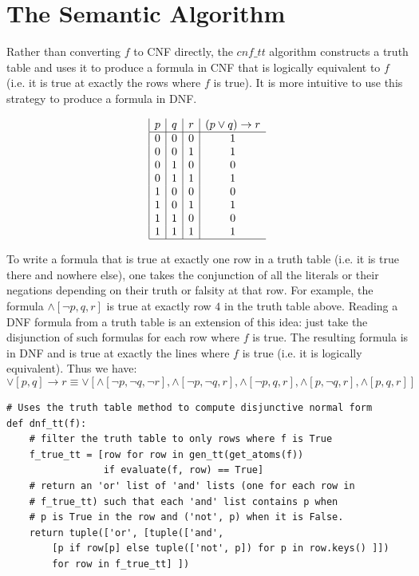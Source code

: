 \documentclass[a4paper,notitlepage]{scrartcl}
\begin{document}
\section{The Semantic Algorithm}

Rather than converting $f$ to CNF directly, the $cnf\_tt$ algorithm
        constructs a truth table and uses it to produce a formula in CNF
        that is logically equivalent to $f$ (i.e. it is true at exactly
        the rows where $f$ is true). 
It is more intuitive to use this strategy to produce a formula
        in DNF.

\begin{displaymath}
\begin{array}{|c|c|c|c}
   p
 & q
 & r
 & (p\lor{}q)\rightarrow{}r \\
\hline
0 & 0 & 0 & 1 \\
0 & 0 & 1 & 1 \\
0 & 1 & 0 & 0 \\
0 & 1 & 1 & 1 \\
1 & 0 & 0 & 0 \\
1 & 0 & 1 & 1 \\
1 & 1 & 0 & 0 \\
1 & 1 & 1 & 1 \\
\hline
\end{array}
\end{displaymath}

To write a formula that is true at exactly one row in a truth table
        (i.e. it is true there and nowhere else), one 
        takes the conjunction of all the literals or their negations depending
        on their truth or falsity at that row.
For example, the formula $\land [\lnot p, q, r]$ is true at exactly row $4$ in
        the truth table above.
Reading a DNF formula from a truth table is an extension of this idea:
        just take the disjunction of such formulas for each row where $f$
        is true.
The resulting formula is in DNF and is true at exactly the lines where $f$
        is true (i.e. it is logically equivalent).
Thus we have:
\[
\lor[p,q]\rightarrow r \equiv 
\lor [
\land[\lnot p, \lnot q,\lnot r], 
\land[\lnot p,\lnot q,r], 
\land[\lnot p,q,r], 
\land[p,\lnot q,r], 
\land[p,q,r]
     ]
\]
        
\begin{verbatim}
# Uses the truth table method to compute disjunctive normal form
def dnf_tt(f):
    # filter the truth table to only rows where f is True
    f_true_tt = [row for row in gen_tt(get_atoms(f)) 
                 if evaluate(f, row) == True]
    # return an 'or' list of 'and' lists (one for each row in
    # f_true_tt) such that each 'and' list contains p when
    # p is True in the row and ('not', p) when it is False.
    return tuple(['or', [tuple(['and', 
        [p if row[p] else tuple(['not', p]) for p in row.keys() ]]) 
        for row in f_true_tt] ])
\end{verbatim}
\end{document}
